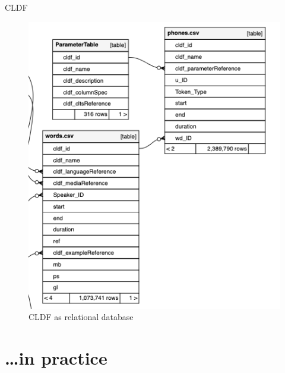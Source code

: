 \begin{frame}{CLDF}
\vspace*{-0.3cm}
	\begin{figure}
		\includegraphics[height=0.75\textheight]{images/relational.png}
		\caption{CLDF as relational database \parencite{Forkel2018}}
	\end{figure}
\end{frame}

\section{\dots in practice}

